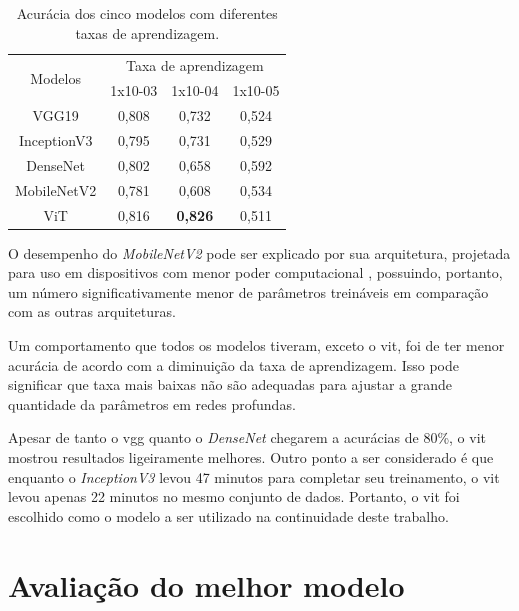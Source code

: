 \begin{table}[tb]
\caption{\label{tab:metrics} Acurácia dos cinco modelos com diferentes taxas de aprendizagem.}
\begin{center}
\begin{tabular}{c|ccc}
\toprule
\multirow{2}{*}{Modelos} & \multicolumn{3}{c}{Taxa de aprendizagem}   \\
                         & 1x10-03     & 1x10-04     & 1x10-05     \\
\midrule
VGG19                    & 0,808 & 0,732 & 0,524 \\
\midrule
InceptionV3              & 0,795     & 0,731     & 0,529        \\
\midrule
DenseNet                 & 0,802     & 0,658     & 0,592     \\
\midrule
MobileNetV2              & 0,781  & 0,608 & 0,534 \\
\midrule
ViT                      & 0,816     & \textbf{0,826}     & 0,511     \\
\bottomrule
\end{tabular}
\end{center}
%
\end{table}

O desempenho do \textit{MobileNetV2} pode ser explicado por sua arquitetura, projetada para uso em dispositivos com menor poder computacional \cite{mobilenetv2}, possuindo, portanto, um número significativamente menor de parâmetros treináveis em comparação com as outras arquiteturas.

Um comportamento que todos os modelos tiveram, exceto o \acrshort{vit}, foi de ter menor acurácia de acordo com a diminuição da taxa de aprendizagem. 
Isso pode significar que taxa mais baixas não são adequadas para ajustar a grande quantidade da parâmetros em redes profundas.

Apesar de tanto o \acrshort{vgg} quanto o \textit{DenseNet} chegarem a acurácias de 80\%, o \acrshort{vit} mostrou resultados ligeiramente melhores. 
Outro ponto a ser considerado é que enquanto o \textit{InceptionV3} levou 47 minutos para completar seu treinamento, o \acrshort{vit} levou apenas 22 minutos no mesmo conjunto de dados. 
Portanto, o \acrshort{vit} foi escolhido como o modelo a ser utilizado na continuidade deste trabalho.
\section{Avaliação do melhor modelo}\label{sec:bestmodel}

